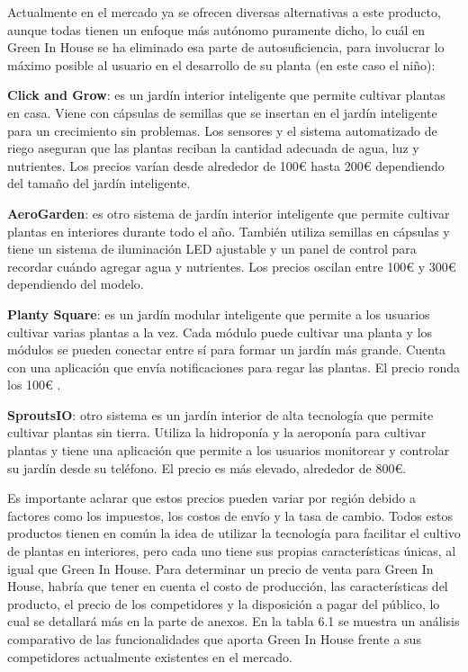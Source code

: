 
Actualmente en el mercado ya se ofrecen diversas alternativas a este producto, aunque todas tienen un enfoque más autónomo puramente dicho, lo cuál en Green In House se ha eliminado esa parte de autosuficiencia, para involucrar lo máximo posible al usuario  en el desarrollo de su planta (en este caso el niño):

\textbf{Click and Grow}: es un jardín interior inteligente que permite cultivar plantas en casa. Viene con cápsulas de semillas que se insertan en el jardín inteligente para un crecimiento sin problemas. Los sensores y el sistema automatizado de riego aseguran que las plantas reciban la cantidad adecuada de agua, luz y nutrientes. Los precios varían desde alrededor de 100€ hasta 200€ dependiendo del tamaño del jardín inteligente.

\textbf{AeroGarden}: es otro sistema de jardín interior inteligente que permite cultivar plantas en interiores durante todo el año. También utiliza semillas en cápsulas y tiene un sistema de iluminación LED ajustable y un panel de control para recordar cuándo agregar agua y nutrientes. Los precios oscilan entre 100€ y 300€ dependiendo del modelo.

\textbf{Planty Square}: es un jardín modular inteligente que permite a los usuarios cultivar varias plantas a la vez. Cada módulo puede cultivar una planta y los módulos se pueden conectar entre sí para formar un jardín más grande. Cuenta con una aplicación que envía notificaciones para regar las plantas. El precio ronda los 100€ .

\textbf{SproutsIO}: otro sistema es un jardín interior de alta tecnología que permite cultivar plantas sin tierra. Utiliza la hidroponía y la aeroponía para cultivar plantas y tiene una aplicación que permite a los usuarios monitorear y controlar su jardín desde su teléfono. El precio es más elevado, alrededor de 800€.

Es importante aclarar que estos precios pueden variar por región debido a factores como los impuestos, los costos de envío y la tasa de cambio. Todos estos productos tienen en común la idea de utilizar la tecnología para facilitar el cultivo de plantas en interiores, pero cada uno tiene sus propias características únicas, al igual que Green In House. Para determinar un precio de venta para Green In House, habría que tener en cuenta el costo de producción, las características del producto, el precio de los competidores y la disposición a pagar del público, lo cual se detallará más en la parte de anexos. En la tabla 6.1 se muestra un análisis comparativo de las funcionalidades que aporta Green In House frente a sus competidores actualmente existentes en el mercado.

